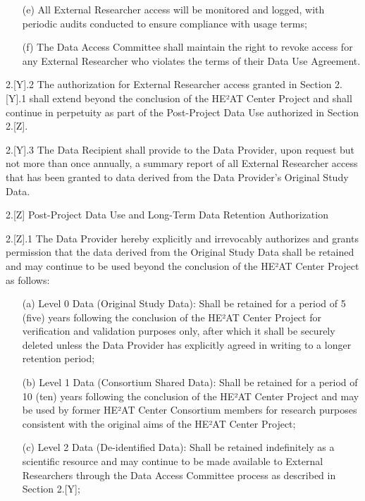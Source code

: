 \documentclass[12pt,letterpaper]{article}
\begin{document}
\begin{enumerate}
\begin{enumerate}
\item[(e)] All External Researcher access will be monitored and logged, with periodic audits conducted to ensure compliance with usage terms;
   
\item[(f)] The Data Access Committee shall maintain the right to revoke access for any External Researcher who violates the terms of their Data Use Agreement.
\end{enumerate}

2.[Y].2 The authorization for External Researcher access granted in Section 2.[Y].1 shall extend beyond the conclusion of the HE²AT Center Project and shall continue in perpetuity as part of the Post-Project Data Use authorized in Section 2.[Z].

2.[Y].3 The Data Recipient shall provide to the Data Provider, upon request but not more than once annually, a summary report of all External Researcher access that has been granted to data derived from the Data Provider's Original Study Data.

2.[Z] Post-Project Data Use and Long-Term Data Retention Authorization

2.[Z].1 The Data Provider hereby explicitly and irrevocably authorizes and grants permission that the data derived from the Original Study Data shall be retained and may continue to be used beyond the conclusion of the HE²AT Center Project as follows:

\begin{enumerate}
\item[(a)] Level 0 Data (Original Study Data): Shall be retained for a period of 5 (five) years following the conclusion of the HE²AT Center Project for verification and validation purposes only, after which it shall be securely deleted unless the Data Provider has explicitly agreed in writing to a longer retention period;
   
\item[(b)] Level 1 Data (Consortium Shared Data): Shall be retained for a period of 10 (ten) years following the conclusion of the HE²AT Center Project and may be used by former HE²AT Center Consortium members for research purposes consistent with the original aims of the HE²AT Center Project;
   
\item[(c)] Level 2 Data (De-identified Data): Shall be retained indefinitely as a scientific resource and may continue to be made available to External Researchers through the Data Access Committee process as described in Section 2.[Y];
   

\end{enumerate}
\end{enumerate}
\end{document}
